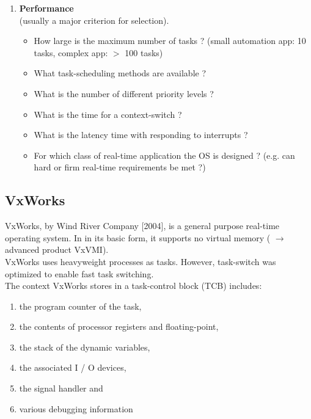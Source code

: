 \begin{enumerate}
\item  \textbf{Performance}\\ (usually a major criterion for selection). 
\begin{itemize}
	\item How large is the maximum number of tasks ?   (small automation app: 10 tasks, complex app: $\mathrm{>}$ 100 tasks)
	\item What task-scheduling methods are available ?
	\item What is the number of different priority levels ?
	\item What is the time for a context-switch ?
	\item What is the latency time with responding to interrupts ?
	\item For which class of real-time application the OS is designed ?  (e.g. can hard or firm real-time requirements be met ?)
\end{itemize}
\end{enumerate}

\subsection{ VxWorks}

VxWorks, by Wind River Company [2004], is a general purpose real-time operating system. In in its basic form, it supports no virtual memory ( $\rightarrow$ advanced product VxVMI).\\

VxWorks uses heavyweight processes as tasks. However, task-switch was optimized to enable fast task switching. \\

The context VxWorks stores in a task-control block (TCB) includes:

\begin{enumerate}
\item  the program counter of the task,

\item  the contents of processor registers and floating-point,

\item  the stack of the dynamic variables,

\item  the associated I / O devices,

\item  the signal handler and

\item  various debugging information
\end{enumerate}

